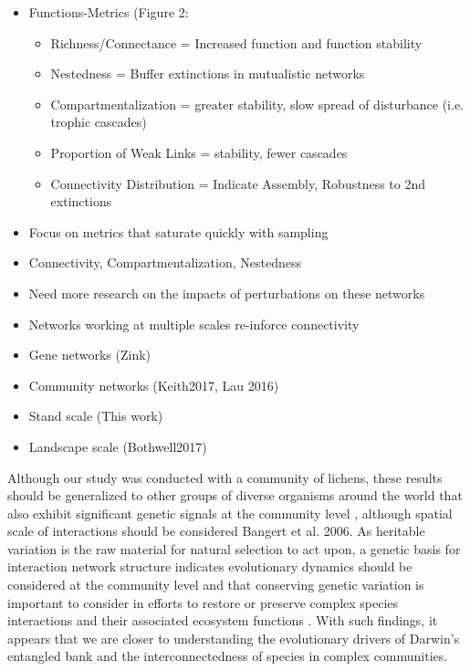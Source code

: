 \documentclass[fleqn,10pt]{wlscirep}
\begin{document}
\begin{itemize}
\item Functions-Metrics (Figure 2: 
  \begin{itemize}
  \item Richness/Connectance = Increased function and function
    stability
  \item Nestedness = Buffer extinctions in mutualistic networks
  \item Compartmentalization = greater stability, slow spread of
    disturbance (i.e. trophic cascades)
  \item Proportion of Weak Links = stability, fewer cascades
  \item Connectivity Distribution = Indicate Assembly, Robustness to
    2nd extinctions
  \end{itemize}
\item Focus on metrics that saturate quickly with sampling
\item Connectivity, Compartmentalization, Nestedness
\item Need more research on the impacts of perturbations on these
  networks
\end{itemize}



\begin{itemize}
\item Networks working at multiple scales re-inforce connectivity
\item Gene networks (Zink)
\item Community networks (Keith2017, Lau 2016)
\item Stand scale (This work)
\item Landscape scale (Bothwell2017)
\end{itemize}

Although our study was conducted with a community of lichens, these
results should be generalized to other groups of diverse organisms
around the world that also exhibit significant genetic signals at the
community level \cite{Rowntree2011, Whitham2012}, although spatial
scale of interactions should be considered \cite{Zook2010} Bangert et
al. 2006. As heritable variation is the raw material for natural
selection to act upon, a genetic basis for interaction network
structure indicates evolutionary dynamics should be considered at the
community level and that conserving genetic variation is important to
consider in efforts to restore or preserve complex species
interactions and their associated ecosystem functions
\cite{Evans2013}.  With such findings, it appears that we are closer
to understanding the evolutionary drivers of Darwin's entangled bank
and the interconnectedness of species in complex communities.
\end{document}
